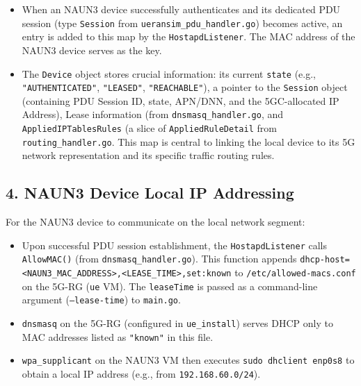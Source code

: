 \begin{itemize}
    \item When an \ac{NAUN3} device successfully authenticates and its dedicated \ac{PDU} session (type \texttt{Session} from \texttt{ueransim\_pdu\_handler.go}) becomes active, an entry is added to this map by the \texttt{HostapdListener}. The \ac{MAC} address of the \ac{NAUN3} device serves as the key.
    
    \item The \texttt{Device} object stores crucial information: its current \texttt{state} (e.g., \texttt{"AUTHENTICATED"}, \texttt{"LEASED"}, \texttt{"REACHABLE"}), a pointer to the \texttt{Session} object (containing \ac{PDU} Session ID, state, \ac{APN}/\ac{DNN}, and the \ac{5GC}-allocated \ac{IP} Address), Lease information (from \texttt{dnsmasq\_handler.go}, and \texttt{AppliedIPTablesRules} (a slice of \texttt{AppliedRuleDetail} from \texttt{routing\_handler.go}. This map is central to linking the local device to its \ac{5G} network representation and its specific traffic routing rules.
\end{itemize}

\subsection{4. \acs{NAUN3} Device Local \acs{IP} Addressing}

For the \ac{NAUN3} device to communicate on the local network segment:

\begin{itemize}
    \item Upon successful \ac{PDU} session establishment, the \texttt{HostapdListener} calls \texttt{AllowMAC()} (from \texttt{dnsmasq\_handler.go}). This function appends \texttt{dhcp-host=<NAUN3\_MAC\_ADDRESS>,<LEASE\_TIME>,set:known} to \texttt{/etc/allowed-macs.conf} on the \ac{5G-RG} (\texttt{ue} \ac{VM}). The \texttt{leaseTime} is passed as a command-line argument (\texttt{--lease-time}) to \texttt{main.go}.

    \item \texttt{dnsmasq} on the \ac{5G-RG} (configured in \texttt{ue\_install}) serves \ac{DHCP} only to \ac{MAC} addresses listed as \texttt{"known"} in this file.

    \item \texttt{wpa\_supplicant} on the \ac{NAUN3} \ac{VM} then executes \texttt{sudo dhclient enp0s8} to obtain a local \ac{IP} address (e.g., from \texttt{192.168.60.0/24}).
\end{itemize}

